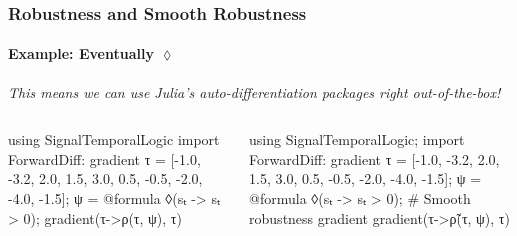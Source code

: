 
% 

\begin{frame}[fragile,t]
\frametitle{Robustness and Smooth Robustness}
\framesubtitle{Example: Eventually $\lozenge$}

\phantom{}

\begin{small}
\textit{This means we can use Julia's {\color{captioncolor}auto-differentiation} packages right out-of-the-box!}
\end{small}

\pause
\begin{columns}
\begin{column}[t]{0.5\textwidth}
\begin{tiny}
\begin{juliaconsole}
using SignalTemporalLogic
import ForwardDiff: gradient
τ = [-1.0, -3.2, 2.0, 1.5, 3.0, 0.5, -0.5, -2.0, -4.0, -1.5];
ψ = @formula ◊(sₜ -> sₜ > 0);
gradient(τ->ρ(τ, ψ), τ)
\end{juliaconsole}
\end{tiny}
\end{column}

\pause\pause\pause
\begin{column}[t]{0.5\textwidth}
\begin{tiny}
\begin{juliaconsole}
using SignalTemporalLogic; import ForwardDiff: gradient
τ = [-1.0, -3.2, 2.0, 1.5, 3.0, 0.5, -0.5, -2.0, -4.0, -1.5];
ψ = @formula ◊(sₜ -> sₜ > 0);
# Smooth robustness gradient
gradient(τ->ρ̃(τ, ψ), τ)
\end{juliaconsole}

\phantom{}

\pause
{}
\end{tiny}
\end{column}
\end{columns}


\end{frame}


